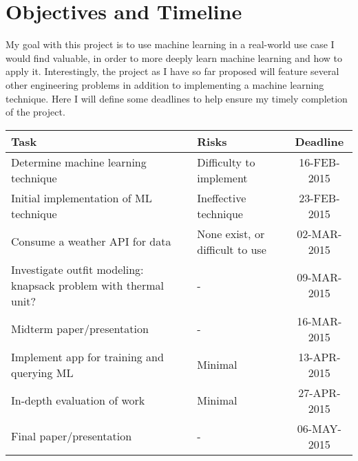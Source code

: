 \section{Objectives and Timeline}
\label{section:objectives}
My goal with this project is to use machine learning in a real-world use case I would find valuable, in order to
more deeply learn machine learning and how to apply it. Interestingly, the project as I have so far proposed will
feature several other engineering problems in addition to implementing a machine learning technique. Here I will
define some deadlines to help ensure my timely completion of the project.

\begin{center}
 \begin{tabular}{||l l c ||}
 \hline
 \textbf{Task} & \textbf{Risks} & \textbf{Deadline} \\ [0.5ex]
 \hline\hline
 Determine machine learning technique & Difficulty to implement & 16-FEB-2015 \\
 \hline
 Initial implementation of ML technique & Ineffective technique & 23-FEB-2015 \\
 \hline
 Consume a weather API for data & None exist, or difficult to use & 02-MAR-2015 \\
 \hline
 Investigate outfit modeling: knapsack problem with thermal unit? & - & 09-MAR-2015 \\
 \hline
 Midterm paper/presentation & - & 16-MAR-2015 \\
 \hline
 Implement app for training and querying ML & Minimal & 13-APR-2015 \\
 \hline
 In-depth evaluation of work & Minimal & 27-APR-2015 \\
 \hline
 Final paper/presentation & - & 06-MAY-2015 \\
 \hline
\end{tabular}
\end{center}